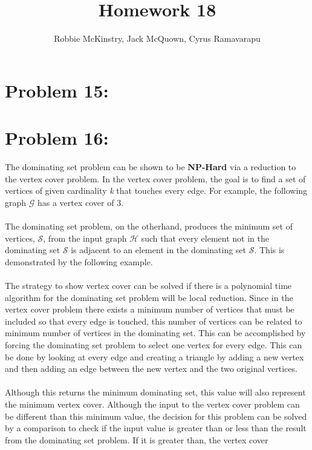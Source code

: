 \documentclass[12pt]{article}
\begin{document}
\title{Homework 18}
\author{Robbie McKinstry, Jack McQuown, Cyrus Ramavarapu}
\renewcommand{\today}{12 October 2016}
\renewcommand{\baselinestretch}{1.5}
\maketitle

\section*{Problem 15: }
\section*{Problem 16: }
The dominating set problem can be shown to be \textbf{NP-Hard} via 
a reduction to the vertex cover problem.  In the vertex cover problem,
the goal is to find a set of vertices of given cardinality \textit{k} 
that touches every edge.  For example, the following graph $\mathcal{G}$
has a vertex cover of $3$.\\\\
The dominating set problem, on the otherhand, produces the minimum set 
of vertices, $\mathcal{S}$, from the input graph $\mathcal{H}$ such that every element
not in the dominating set $\mathcal{S}$ is adjacent to an element in the
dominating set $\mathcal{S}$.  This is demonstrated by the following example.\\\\
The strategy to show vertex cover can be solved if there is a polynomial time 
algorithm for the dominating set problem will be local reduction.  Since in the
vertex cover problem there exists a minimum number of vertices that must be
included so that every edge is touched, this number of vertices can be related
to minimum number of vertices in the dominating set.  This can be accomplished by
forcing the dominating set problem to select one vertex for every edge.  This can
be done by looking at every edge and creating a triangle by adding a new vertex
and then adding an edge between the new vertex and the two original vertices.\\\\
Although this returns the minimum dominating set, this value will also represent
the minimum vertex cover.  Although the input to the vertex cover problem can be
different than this minimum value, the decision for this problem can be solved
by a comparison to check if the input value is greater than or less than the
result from the dominating set problem.  If it is greater than, the vertex cover
\end{document}
